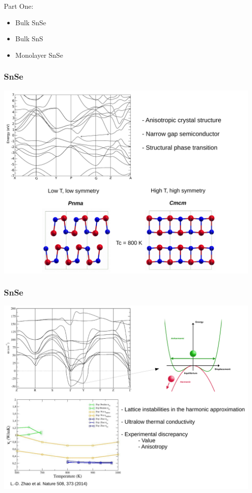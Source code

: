 \documentclass{beamer}
\begin{document}

\begin{frame}

Part One:
\begin{itemize}
\item Bulk SnSe
\item Bulk SnS
\item Monolayer SnSe
\end{itemize}

\end{frame}


\begin{frame}

\frametitle{SnSe}
\begin{center}
  \includegraphics[width=0.85\linewidth]{Pictures/SnSe/figure1.pdf}
\end{center}

\end{frame}


\begin{frame}

\frametitle{SnSe}
\begin{center}
  \includegraphics[width=0.85\linewidth]{Pictures/SnSe/figure2.pdf}
\end{center}

\end{frame}
\end{document}
